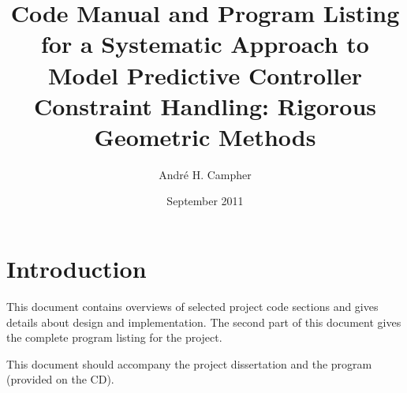 \documentclass[a4paper,12pt,pdftex]{article}
\title{Code Manual and Program Listing for a Systematic Approach to Model Predictive Controller Constraint 
  Handling: Rigorous Geometric Methods}
\author{Andr\'e H. Campher}
\date{September 2011}
\begin{document}
\maketitle

\newpage

\tableofcontents

\newpage

\section{Introduction}
This document contains overviews of selected project code sections and gives details about design and implementation.
The second part of this document gives the complete program listing for the project.

This document should accompany the project dissertation and the program (provided on the CD).






\end{document}
